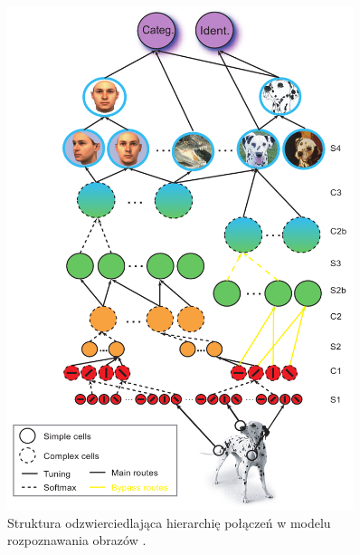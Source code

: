 \begin{figure}[ht]
	\centering
	\includegraphics[width=0.9\textwidth]{images/Poggio_book_struct.png}
	\caption{Struktura odzwierciedlająca hierarchię połączeń w modelu rozpoznawania obrazów \cite{Serre2005}.}
	\label{fig:Poggio_BookModel}
\end{figure}

